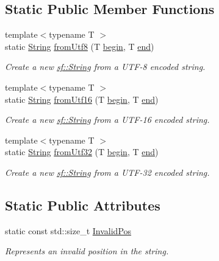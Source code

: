 \subsection*{Static Public Member Functions}
\begin{DoxyCompactItemize}
\item 
{\footnotesize template$<$typename T $>$ }\\static \mbox{\hyperlink{classsf_1_1_string}{String}} \mbox{\hyperlink{classsf_1_1_string_aa7beb7ae5b26e63dcbbfa390e27a9e4b}{from\+Utf8}} (T \mbox{\hyperlink{classsf_1_1_string_a8ec30ddc08e3a6bd11c99aed782f6dfe}{begin}}, T \mbox{\hyperlink{classsf_1_1_string_ac823012f39cb6f61100418876e99d53b}{end}})
\begin{DoxyCompactList}\small\item\em Create a new \mbox{\hyperlink{classsf_1_1_string}{sf\+::\+String}} from a U\+T\+F-\/8 encoded string. \end{DoxyCompactList}\item 
{\footnotesize template$<$typename T $>$ }\\static \mbox{\hyperlink{classsf_1_1_string}{String}} \mbox{\hyperlink{classsf_1_1_string_a81f70eecad0000a4f2e4d66f97b80300}{from\+Utf16}} (T \mbox{\hyperlink{classsf_1_1_string_a8ec30ddc08e3a6bd11c99aed782f6dfe}{begin}}, T \mbox{\hyperlink{classsf_1_1_string_ac823012f39cb6f61100418876e99d53b}{end}})
\begin{DoxyCompactList}\small\item\em Create a new \mbox{\hyperlink{classsf_1_1_string}{sf\+::\+String}} from a U\+T\+F-\/16 encoded string. \end{DoxyCompactList}\item 
{\footnotesize template$<$typename T $>$ }\\static \mbox{\hyperlink{classsf_1_1_string}{String}} \mbox{\hyperlink{classsf_1_1_string_ab023a4900dce37ee71ab9e29b30a23cb}{from\+Utf32}} (T \mbox{\hyperlink{classsf_1_1_string_a8ec30ddc08e3a6bd11c99aed782f6dfe}{begin}}, T \mbox{\hyperlink{classsf_1_1_string_ac823012f39cb6f61100418876e99d53b}{end}})
\begin{DoxyCompactList}\small\item\em Create a new \mbox{\hyperlink{classsf_1_1_string}{sf\+::\+String}} from a U\+T\+F-\/32 encoded string. \end{DoxyCompactList}\end{DoxyCompactItemize}
\subsection*{Static Public Attributes}
\begin{DoxyCompactItemize}
\item 
\mbox{\label{classsf_1_1_string_abaadecaf12a6b41c54d725c75fd28527}} 
static const std\+::size\+\_\+t \mbox{\hyperlink{classsf_1_1_string_abaadecaf12a6b41c54d725c75fd28527}{Invalid\+Pos}}
\begin{DoxyCompactList}\small\item\em Represents an invalid position in the string. \end{DoxyCompactList}\end{DoxyCompactItemize}
